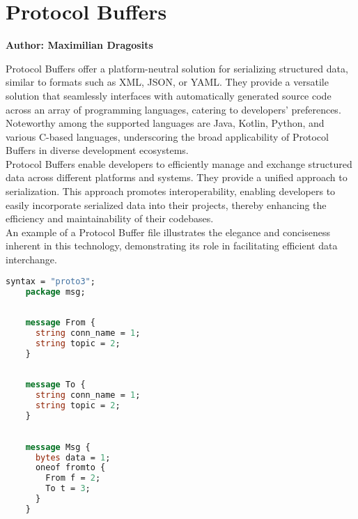 \section{Protocol Buffers}
\textbf{Author: Maximilian Dragosits}

Protocol Buffers offer a platform-neutral solution for serializing structured data, similar to formats such as XML, JSON, or YAML. They provide a versatile 
solution that seamlessly interfaces with automatically generated source code across an array of programming languages, catering to developers' preferences. 
Noteworthy among the supported languages are Java, Kotlin, Python, and various C-based languages, underscoring the broad applicability of Protocol Buffers 
in diverse development ecosystems.\\

Protocol Buffers enable developers to efficiently manage and exchange structured data across different platforms and systems. They provide a unified approach 
to serialization. This approach promotes interoperability, enabling developers to easily incorporate serialized data into their projects, thereby enhancing the efficiency and 
maintainability of their codebases.\\

An example of a Protocol Buffer file illustrates the elegance and conciseness inherent in this technology, demonstrating its role in facilitating efficient 
data interchange.

\begin{minipage}{\textwidth}
\begin{lstlisting}[language=ProtoBuf, caption=Excerpt taken from the ProtoBuf files of this project]
    syntax = "proto3";
    package msg;
    
    
    message From {
      string conn_name = 1;
      string topic = 2;
    }
    
    
    message To {
      string conn_name = 1;
      string topic = 2;
    }
    
    
    message Msg {
      bytes data = 1;
      oneof fromto {
        From f = 2;
        To t = 3;
      }
    }
\end{lstlisting}
\end{minipage}

